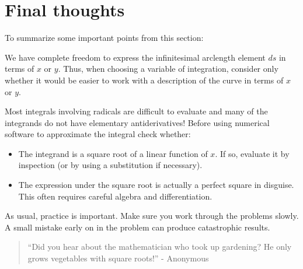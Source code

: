 \documentclass{ximera}
\begin{document}
\section{Final thoughts}
To summarize some important points from this section:


\begin{fact}
We have complete freedom to express the infinitesimal arclength element $ds$ in terms of $x$ or $y$.  Thus, when choosing a variable of integration, consider only whether it would be easier to work with a description of the curve in terms of $x$ or $y$.\end{fact}

\begin{fact}
Most integrals involving radicals are difficult to evaluate and many of the integrands do not have elementary antiderivatives!  Before using numerical software to approximate the integral check whether:

\begin{itemize}
\item The integrand is a square root of a linear function of $x$.  If so, evaluate it by inspection (or by using a substitution if necessary).
\item The expression under the square root is actually a perfect square in disguise.  This often requires careful algebra and differentiation.
\end{itemize}
\end{fact}

As usual, practice is important.  Make sure you work through the problems slowly.  A small mistake early on in the problem can produce catastrophic results.

\begin{quote}
``Did you hear about the mathematician who took up gardening?  He only grows vegetables with square roots!'' - Anonymous
\end{quote}
\end{document}
